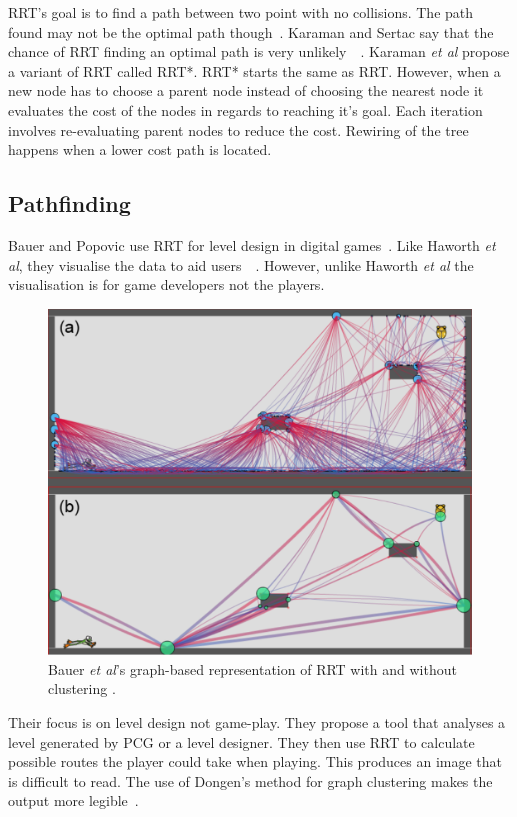 \documentclass[journal]{IEEEtran}
\begin{document}
RRT's goal is to find a path between two point with no collisions. The path found may not be the optimal path though~\cite{Kuffner2000, Karaman2011}.  Karaman and Sertac say that the chance of RRT finding an optimal path is very unlikely~\cite{karaman2010}~\cite{Tremblay2014}.  Karaman \textit{et al} propose a variant of RRT called RRT*. RRT* starts the same as RRT. However, when a new node has to choose a parent node instead of choosing the  nearest node it evaluates the cost of the nodes in regards to reaching it's goal. Each iteration involves re-evaluating parent nodes to reduce the cost. Rewiring of the tree happens when a lower cost path is located.

\subsection{Pathfinding}
Bauer and Popovic use RRT for level design in digital games~\cite{bauer2012}. Like Haworth \textit{et al}, they visualise the data to aid users~\cite{bauer2012}~\cite{Haworth2010}. However, unlike Haworth \textit{et al} the visualisation is for game developers not the players. 

\begin{figure}[h]
	\includegraphics[width=1.0\linewidth]{BauerRRT.png}
	\caption{ Bauer \textit{et al}'s graph-based representation of RRT with and without clustering \cite{bauer2012}.}
	\label{BauerRRT}
\end{figure} 

Their focus is on level design not game-play. They propose a tool that analyses a level generated by PCG or a level designer. They then use RRT to calculate possible routes the player could take when playing.  
This produces an image that is difficult to read. The use of Dongen's method for graph clustering makes the output more legible~\cite{bauer2012, van2001}.  
\end{document}
